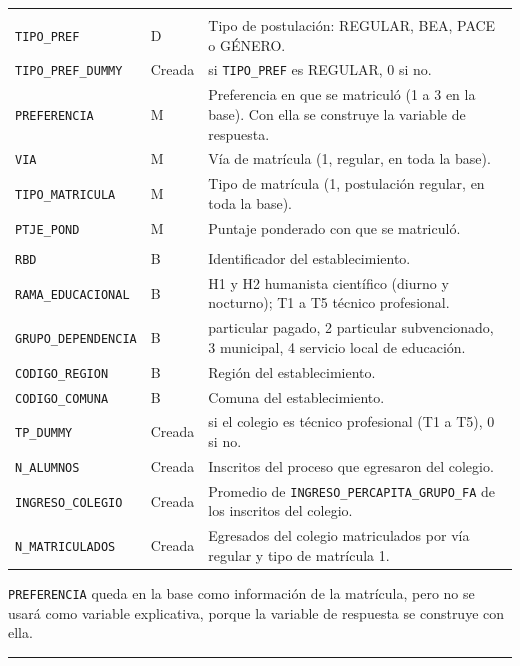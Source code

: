 \documentclass[11pt]{article}
\begin{document}
\begin{longtable}{>{\raggedright\arraybackslash}p{5.4cm}
                  >{\raggedright\arraybackslash}p{1.4cm}
                  >{\raggedright\arraybackslash}p{6.6cm}}
\midrule
\multicolumn{3}{l}{\textit{Postulación y matrícula}} \\
\texttt{TIPO\_PREF} & D & Tipo de postulación: REGULAR, BEA, PACE o GÉNERO. \\
\texttt{TIPO\_PREF\_DUMMY} & Creada & 1 si \texttt{TIPO\_PREF} es REGULAR, 0 si no. \\
\texttt{PREFERENCIA} & M & Preferencia en que se matriculó (1 a 3 en la base). Con ella se construye la variable de respuesta. \\
\texttt{VIA} & M & Vía de matrícula (1, regular, en toda la base). \\
\texttt{TIPO\_MATRICULA} & M & Tipo de matrícula (1, postulación regular, en toda la base). \\
\texttt{PTJE\_POND} & M & Puntaje ponderado con que se matriculó. \\
\midrule
\multicolumn{3}{l}{\textit{Colegio de egreso}} \\
\texttt{RBD} & B & Identificador del establecimiento. \\
\texttt{RAMA\_EDUCACIONAL} & B & H1 y H2 humanista científico (diurno y nocturno); T1 a T5 técnico profesional. \\
\texttt{GRUPO\_DEPENDENCIA} & B & 1 particular pagado, 2 particular subvencionado, 3 municipal, 4 servicio local de educación. \\
\texttt{CODIGO\_REGION} & B & Región del establecimiento. \\
\texttt{CODIGO\_COMUNA} & B & Comuna del establecimiento. \\
\texttt{TP\_DUMMY} & Creada & 1 si el colegio es técnico profesional (T1 a T5), 0 si no. \\
\texttt{N\_ALUMNOS} & Creada & Inscritos del proceso que egresaron del colegio. \\
\texttt{INGRESO\_COLEGIO} & Creada & Promedio de \texttt{INGRESO\_PERCAPITA\_GRUPO\_FA} de los inscritos del colegio. \\
\texttt{N\_MATRICULADOS} & Creada & Egresados del colegio matriculados por vía regular y tipo de matrícula 1. \\
\end{longtable}

\texttt{PREFERENCIA} queda en la base como información de la matrícula,
pero no se usará como variable explicativa, porque la variable de
respuesta se construye con ella.

\medskip\hrule\medskip

\end{document}
